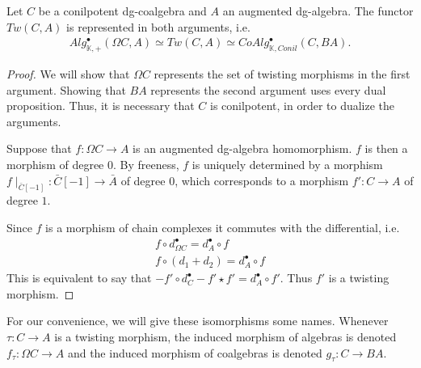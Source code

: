 \documentclass[../thesis.tex]{subfiles}
\begin{document}
            \begin{thm}
                Let $C$ be a conilpotent dg-coalgebra and $A$ an augmented dg-algebra. The functor $Tw(C,A)$ is represented in both arguments, i.e.
                \begin{align*}
                    Alg_{\mathbb{K},+}^\bullet(\Omega C, A)\simeq Tw(C, A) \simeq CoAlg_{\mathbb{K},Conil}^\bullet(C, BA)\text{.}
                \end{align*}
            \end{thm}

            \begin{proof}
                We will show that $\Omega C$ represents the set of twisting morphisms in the first argument. Showing that $BA$ represents the second argument uses every dual proposition. Thus, it is necessary that $C$ is conilpotent, in order to dualize the arguments.

                Suppose that $f:\Omega C \rightarrow A$ is an augmented dg-algebra homomorphism. $f$ is then a morphism of degree $0$. By freeness, $f$ is uniquely determined by a morphism $f\mid_{\bar{C}[-1]}:\bar{C}[-1]\rightarrow \bar{A}$ of degree $0$, which corresponds to a morphism $f':C\rightarrow A$ of degree $1$. 

                Since $f$ is a morphism of chain complexes it commutes with the differential, i.e. 
                \begin{align*}
                    f\circ d_{\Omega C}^\bullet = d_A^\bullet\circ f \\
                    f\circ (d_1 + d_2) = d_A^\bullet\circ f 
                \end{align*}
                This is equivalent to say that $-f'\circ d_C^\bullet - f'\star f' = d_A^\bullet\circ f'$. Thus $f'$ is a twisting morphism.
            \end{proof}

            For our convenience, we will give these isomorphisms some names. Whenever $\tau : C \rightarrow A$ is a twisting morphism, the induced morphism of algebras is denoted $f_\tau : \Omega C \rightarrow A$ and the induced morphism of coalgebras is denoted $g_\tau : C \rightarrow BA$.
\end{document}
